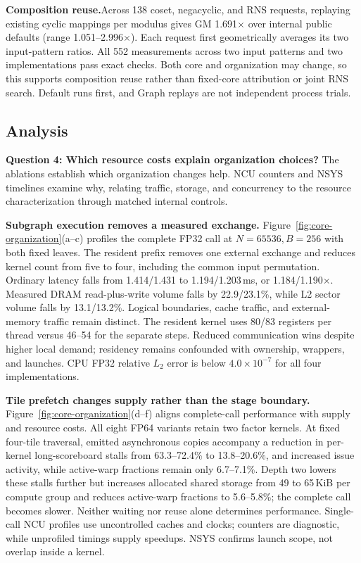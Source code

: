 \textbf{Composition reuse.}\nopagebreak[4]
Across 138 coset, negacyclic, and RNS requests, replaying existing cyclic
mappings per modulus gives GM 1.691$\times$ over internal public defaults
(range 1.051--2.996$\times$). Each request first geometrically averages its two input-pattern ratios.
All 552 measurements across two input patterns and two implementations pass
exact checks. Both core and organization may
change, so this supports composition reuse rather than fixed-core attribution
or joint RNS search. Default runs first, and Graph replays are not independent
process trials.

\subsection{Analysis}
\textbf{Question 4: Which resource costs explain organization choices?}
The ablations establish which organization changes help. NCU counters and
NSYS timelines examine why, relating traffic, storage, and concurrency
to the resource characterization through matched internal controls.

\textbf{Subgraph execution removes a measured exchange.}
Figure~\ref{fig:core-organization}(a--c) profiles the complete FP32 call at
$N=65536,B=256$ with both fixed leaves. The resident prefix removes one
external exchange and reduces kernel count from five to four, including
the common input permutation. Ordinary latency falls from 1.414/1.431 to
1.194/1.203\,ms, or 1.184/1.190$\times$.
Measured DRAM read-plus-write volume falls by 22.9/23.1\%, while L2 sector
volume falls by 13.1/13.2\%. Logical boundaries, cache traffic, and external-memory traffic remain distinct.
The resident kernel uses 80/83 registers per thread versus 46--54 for the
separate steps. Reduced communication wins despite higher local demand; residency remains
confounded with ownership, wrappers, and launches. CPU FP32 relative $L_2$ error is below
$4.0\times10^{-7}$ for all four implementations.

\textbf{Tile prefetch changes supply rather than the stage boundary.}
Figure~\ref{fig:core-organization}(d--f) aligns complete-call performance
with supply and resource costs. All eight FP64 variants retain two factor kernels. At fixed four-tile
traversal, emitted asynchronous copies accompany a reduction in per-kernel
long-scoreboard stalls from 63.3--72.4\% to 13.8--20.6\%, and increased
issue activity, while active-warp fractions remain only 6.7--7.1\%.
Depth two lowers these stalls further but increases allocated shared storage
from 49 to 65\,KiB per compute group and reduces active-warp fractions to
5.6--5.8\%; the complete call becomes slower. Neither waiting nor reuse alone determines performance. Single-call NCU profiles use
uncontrolled caches and clocks; counters are
diagnostic, while unprofiled timings supply speedups. NSYS confirms launch
scope, not overlap inside a kernel.

